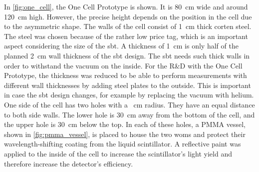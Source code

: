In \autoref{fig:one_cell}, the One Cell Prototype is shown.
It is \SI{80}{\centi\meter} wide and around \SI{120}{\centi\meter} high.
However, the precise height depends on the position in the cell due to the asymmetric shape.
The walls of the cell consist of \SI{1}{\centi\meter} thick corten steel.
The steel was chosen because of the rather low price tag, which is an important aspect considering the size of the \ac{sbt}.
A thickness of \SI{1}{\centi\meter} is only half of the planned \SI{2}{\centi\meter} wall thickness of the \ac{sbt} design.
The \ac{sbt} needs such thick walls in order to withstand the vacuum on the inside.
For the R\&D with the One Cell Prototype, the thickness was reduced to be able to perform measurements with different wall thicknesses by adding steel plates to the outside.
This is important in case the \ac{sbt} design changes, for example by replacing the vacuum with helium.
One side of the cell has two holes with a \SI{}{\centi\meter} radius.
They have an equal distance to both side walls.
The lower hole is \SI{30}{\centi\meter} away from the bottom of the cell, and the upper hole is \SI{30}{\centi\meter} below the top.
In each of these holes, a PMMA vessel, shown in \autoref{fig:pmma_vessel}, is placed to house the two \acp{wom} and protect their wavelength-shifting coating from the liquid scintillator.
A reflective paint was applied to the inside of the cell to increase the scintillator's light yield and therefore increase the detector's efficiency.
